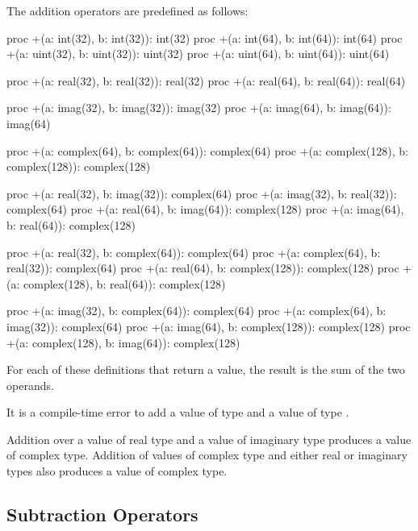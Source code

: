 The addition operators are predefined as follows:
\begin{chapel}
proc +(a: int(32), b: int(32)): int(32)
proc +(a: int(64), b: int(64)): int(64)
proc +(a: uint(32), b: uint(32)): uint(32)
proc +(a: uint(64), b: uint(64)): uint(64)

proc +(a: real(32), b: real(32)): real(32)
proc +(a: real(64), b: real(64)): real(64)

proc +(a: imag(32), b: imag(32)): imag(32)
proc +(a: imag(64), b: imag(64)): imag(64)

proc +(a: complex(64), b: complex(64)): complex(64)
proc +(a: complex(128), b: complex(128)): complex(128)

proc +(a: real(32), b: imag(32)): complex(64)
proc +(a: imag(32), b: real(32)): complex(64)
proc +(a: real(64), b: imag(64)): complex(128)
proc +(a: imag(64), b: real(64)): complex(128)

proc +(a: real(32), b: complex(64)): complex(64)
proc +(a: complex(64), b: real(32)): complex(64)
proc +(a: real(64), b: complex(128)): complex(128)
proc +(a: complex(128), b: real(64)): complex(128)

proc +(a: imag(32), b: complex(64)): complex(64)
proc +(a: complex(64), b: imag(32)): complex(64)
proc +(a: imag(64), b: complex(128)): complex(128)
proc +(a: complex(128), b: imag(64)): complex(128)
\end{chapel}
For each of these definitions that return a value, the result is the
sum of the two operands.

It is a compile-time error to add a value of type  and
a value of type .

Addition over a value of real type and a value of imaginary type
produces a value of complex type.  Addition of values of complex type
and either real or imaginary types also produces a value of complex
type.

\subsection{Subtraction Operators}
\label{Subtraction_Operators}

